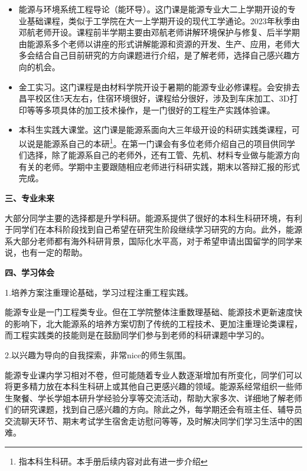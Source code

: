 \begin{itemize}
	\item 能源与环境系统工程导论（能环导）。这门课是能源专业大二上学期开设的专业基础课程，类似于工学院在大一上学期开设的现代工学通论。2023年秋季由邓航老师开设。课程前半学期主要由邓航老师讲解环境保护与修复、后半学期由能源系多个老师以讲座的形式讲解能源和资源的开发、生产、应用，老师大多会结合自己目前研究的方向课题进行介绍，是了解老师，选择自己感兴趣方向的机会。
	
	\item 金工实习。这门课程是由材料学院开设于暑期的能源专业必修课程。会安排去昌平校区住5天左右，住宿环境很好，课程给分很好，涉及到车床加工、3D打印等等多项具体的加工技术操作，是一门很好的工程生产实践体验课。
	
	\item 本科生实践大课堂。这门课是能源系面向大三年级开设的科研实践类课程，可以说是能源系自己的本研\footnote{指本科生科研。本手册后续内容对此有进一步介绍}。在第一门课会有多位老师介绍自己的项目供同学们选择，除了能源系自己的老师外，还有工管、先机、材料专业做与能源方向有关的老师。学期中主要跟随相应老师进行科研实践，期末以答辩汇报的形式完成。
	
\end{itemize}

\textbf{三、专业未来}

大部分同学主要的选择都是升学科研。能源系提供了很好的本科生科研环境，有利于同学们在本科阶段找到自己希望在研究生阶段继续学习研究的方向。此外，能源系大部分老师都有海外科研背景，国际化水平高，对于希望申请出国留学的同学来说，也有一定的帮助。

\vspace{10pt}

\textbf{四、学习体会}

1.培养方案注重理论基础，学习过程注重工程实践。

能源专业是一门工程类专业。但在工学院整体注重数理基础、能源技术更新速度快的影响下，北大能源系的培养方案切割了传统的工程技术、更加注重理论类课程，而工程实践类的技能则是在鼓励同学们参与到老师的科研课题中学习的。

\vspace{10pt}

2.以兴趣为导向的自我探索，非常nice的师生氛围。

能源专业课内学习相对不卷，但可能随着专业人数逐渐增加有所变化，同学们可以将更多精力放在本科生科研上或其他自己更感兴趣的领域。能源系经常组织一些师生聚餐、学长学姐本研升学经验分享等交流活动，帮助大家多次、详细地了解老师们的研究课题，找到自己感兴趣的方向。除此之外，每学期还会有班主任、辅导员交流聊天环节、期末考试学生宿舍走访慰问等等，及时解决同学们学习生活中的困难。

